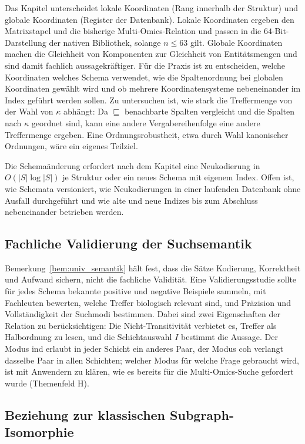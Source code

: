 \documentclass[a4paper,12pt, twoside]{report}
\theoremstyle{definition}
\begin{document}
Das Kapitel unterscheidet lokale Koordinaten (Rang innerhalb der Struktur) und globale Koordinaten (Register der Datenbank). Lokale Koordinaten ergeben den Matrixstapel und die bisherige Multi-Omics-Relation und passen in die $64$-Bit-Darstellung der nativen Bibliothek, solange $n\le63$ gilt. Globale Koordinaten machen die Gleichheit von Komponenten zur Gleichheit von Entitätsmengen und sind damit fachlich aussagekräftiger. Für die Praxis ist zu entscheiden, welche Koordinaten welches Schema verwendet, wie die Spaltenordnung bei globalen Koordinaten gewählt wird und ob mehrere Koordinatensysteme nebeneinander im Index geführt werden sollen. Zu untersuchen ist, wie stark die Treffermenge von der Wahl von $\kappa$ abhängt: Da $\sqsubseteq$ benachbarte Spalten vergleicht und die Spalten nach $\kappa$ geordnet sind, kann eine andere Vergabereihenfolge eine andere Treffermenge ergeben. Eine Ordnungsrobustheit, etwa durch Wahl kanonischer Ordnungen, wäre ein eigenes Teilziel.

Die Schemaänderung erfordert nach dem Kapitel eine Neukodierung in $O(|S|\log|S|)$ je Struktur oder ein neues Schema mit eigenem Index. Offen ist, wie Schemata versioniert, wie Neukodierungen in einer laufenden Datenbank ohne Ausfall durchgeführt und wie alte und neue Indizes bis zum Abschluss nebeneinander betrieben werden.

\subsection{Fachliche Validierung der Suchsemantik}
\label{sec:ausb_univ_validierung}

Bemerkung~\ref{bem:univ_semantik} hält fest, dass die Sätze Kodierung, Korrektheit und Aufwand sichern, nicht die fachliche Validität. Eine Validierungsstudie sollte für jedes Schema bekannte positive und negative Beispiele sammeln, mit Fachleuten bewerten, welche Treffer biologisch relevant sind, und Präzision und Vollständigkeit der Suchmodi bestimmen. Dabei sind zwei Eigenschaften der Relation zu berücksichtigen: Die Nicht-Transitivität verbietet es, Treffer als Halbordnung zu lesen, und die Schichtauswahl $I$ bestimmt die Aussage. Der Modus ind erlaubt in jeder Schicht ein anderes Paar, der Modus coh verlangt dasselbe Paar in allen Schichten; welcher Modus für welche Frage gebraucht wird, ist mit Anwendern zu klären, wie es bereits für die Multi-Omics-Suche gefordert wurde (Themenfeld H).

\subsection{Beziehung zur klassischen Subgraph-Isomorphie}
\label{sec:ausb_univ_iso}
\end{document}
